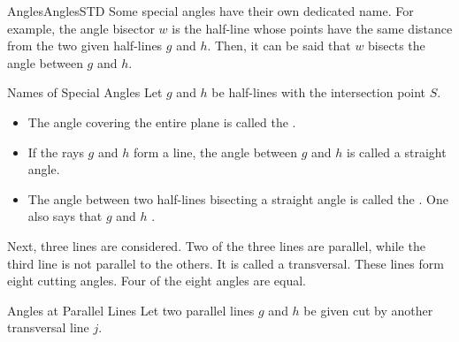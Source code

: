 \begin{MXContent}{Angles}{Angles}{STD}
Some special angles have their own dedicated name. For example, the angle bisector $w$
is the half-line whose points have the same distance from the two given half-lines $g$ 
and $h$. Then, it can be said that $w$ bisects the angle between $g$ and $h$.

\begin{MXInfo}{Names of Special Angles}
Let $g$ and $h$ be half-lines with the intersection point $S$.

\begin{itemize}
\item
The angle covering the entire plane is called the .

\item
If the rays $g$ and $h$ form a line, the angle between $g$ and $h$ is called a
straight angle.
\item
The angle between two half-lines bisecting a straight angle is called the
 . 
One also says that $g$ and $h$ .
\end{itemize}
\end{MXInfo}

Next, three lines are considered. Two of the three lines are parallel, while the 
third line is not parallel to the others. It is called a transversal. These lines form
eight cutting angles. Four of the eight angles are equal.

\begin{MXInfo}{Angles at Parallel Lines}%
%
Let two parallel lines $g$ and $h$  be given cut by another transversal line $j$.



\end{MXInfo}
\end{MXContent}
